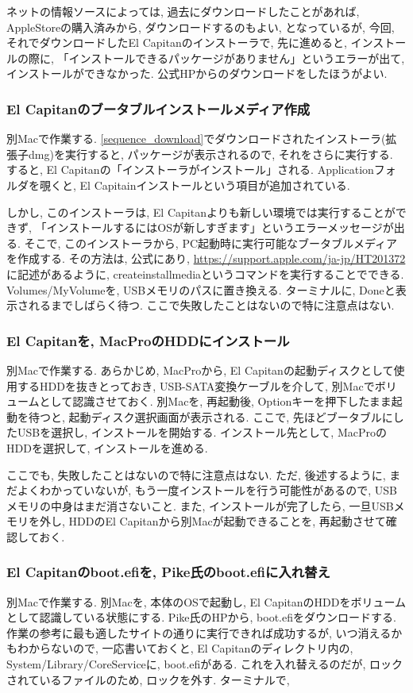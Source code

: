 \documentclass{jsarticle}
\begin{document}
ネットの情報ソースによっては, 過去にダウンロードしたことがあれば, AppleStoreの購入済みから, ダウンロードするのもよい, となっているが, 
今回, それでダウンロードしたEl Capitanのインストーラで, 先に進めると, インストールの際に, 「インストールできるパッケージがありません」というエラーが出て, インストールができなかった. 公式HPからのダウンロードをしたほうがよい. 

\subsubsection{El Capitanのブータブルインストールメディア作成}
別Macで作業する. 
\ref{sequence_download}でダウンロードされたインストーラ(拡張子dmg)を実行すると, パッケージが表示されるので, それをさらに実行する. 
すると, El Capitanの「インストーラがインストール」される. Applicationフォルダを覗くと, El Capitainインストールという項目が追加されている. 

しかし, このインストーラは, El Capitanよりも新しい環境では実行することができず, 「インストールするにはOSが新しすぎます」というエラーメッセージが出る. 
そこで, このインストーラから, PC起動時に実行可能なブータブルメディアを作成する. その方法は, 公式にあり, 
\url{https://support.apple.com/ja-jp/HT201372}
に記述があるように, createinstallmediaというコマンドを実行することでできる.
Volumes/MyVolumeを, USBメモリのパスに置き換える. 
ターミナルに, Doneと表示されるまでしばらく待つ. 
ここで失敗したことはないので特に注意点はない. 

\subsubsection{El Capitanを, MacProのHDDにインストール}
別Macで作業する. 
あらかじめ, MacProから, El Capitanの起動ディスクとして使用するHDDを抜きとっておき, USB-SATA変換ケーブルを介して, 別Macでボリュームとして認識させておく. 
別Macを, 再起動後, Optionキーを押下したまま起動を待つと, 起動ディスク選択画面が表示される. 
ここで, 先ほどブータブルにしたUSBを選択し, インストールを開始する. インストール先として, MacProのHDDを選択して, インストールを進める. 

ここでも, 失敗したことはないので特に注意点はない. ただ, 後述するように, まだよくわかっていないが, もう一度インストールを行う可能性があるので, USBメモリの中身はまだ消さないこと. 
また, インストールが完了したら, 一旦USBメモリを外し, HDDのEl Capitanから別Macが起動できることを, 再起動させて確認しておく. 

\subsubsection{El Capitanのboot.efiを, Pike氏のboot.efiに入れ替え}
別Macで作業する. 
別Macを, 本体のOSで起動し, El CapitanのHDDをボリュームとして認識している状態にする. 
Pike氏のHP\cite{Pike}から, boot.efiをダウンロードする. 
作業の参考に最も適したサイト\cite{Easiest_Reference}の通りに実行できれば成功するが, いつ消えるかもわからないので, 一応書いておくと, 
El Capitanのディレクトリ内の, 
System/Library/CoreServiceに, boot.efiがある. 
これを入れ替えるのだが, ロックされているファイルのため, ロックを外す. 
ターミナルで, 
\end{document}
